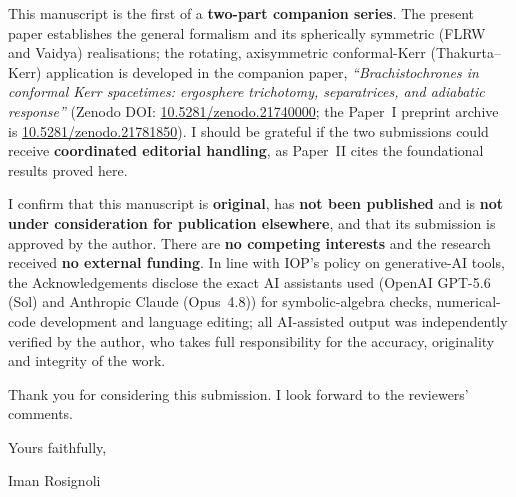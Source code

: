 \documentclass[11pt]{article}
\begin{document}
This manuscript is the first of a \textbf{two-part companion series}. The present paper
establishes the general formalism and its spherically symmetric (FLRW and Vaidya)
realisations; the rotating, axisymmetric conformal-Kerr (Thakurta--Kerr) application is
developed in the companion paper, \emph{``Brachistochrones in conformal Kerr spacetimes:
ergosphere trichotomy, separatrices, and adiabatic response''}
(Zenodo DOI: \href{https://doi.org/10.5281/zenodo.21740000}{10.5281/zenodo.21740000}; the
Paper~I preprint archive is
\href{https://doi.org/10.5281/zenodo.21781850}{10.5281/zenodo.21781850}).
I should be grateful if the two submissions could receive \textbf{coordinated editorial
handling}, as Paper~II cites the foundational results proved here.

I confirm that this manuscript is \textbf{original}, has \textbf{not been published} and is
\textbf{not under consideration for publication elsewhere}, and that its submission is
approved by the author. There are \textbf{no competing interests} and the research received
\textbf{no external funding}. In line with IOP's policy on generative-AI tools, the
Acknowledgements disclose the exact AI assistants used (OpenAI GPT-5.6 (Sol) and Anthropic
Claude (Opus~4.8)) for symbolic-algebra checks, numerical-code development and language
editing; all AI-assisted output was independently verified by the author, who takes full
responsibility for the accuracy, originality and integrity of the work.

Thank you for considering this submission. I look forward to the reviewers' comments.

\vspace{0.6em}
\noindent Yours faithfully,

\vspace{1.6em}
\noindent Iman Rosignoli
\end{document}
